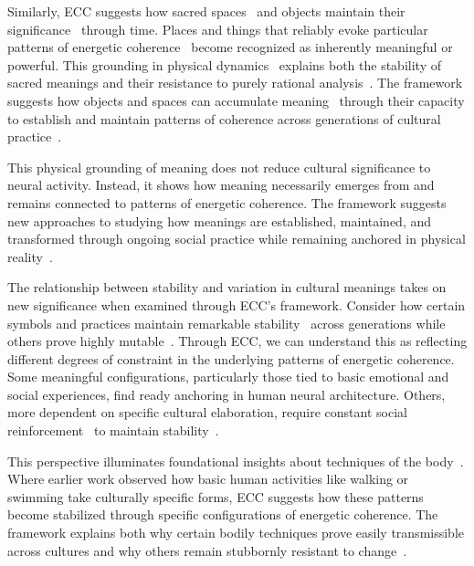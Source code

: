 Similarly, ECC suggests how sacred spaces~ and objects maintain their significance~ through time. Places and things that reliably evoke particular patterns of energetic coherence~ become recognized as inherently meaningful or powerful. This grounding in physical dynamics~ explains both the stability of sacred meanings and their resistance to purely rational analysis~\cite{eliade1959sacred}. The framework suggests how objects and spaces can accumulate meaning~ through their capacity to establish and maintain patterns of coherence across generations of cultural practice~\cite{keane2003semiotics,myers2015rendering}.

This physical grounding of meaning does not reduce cultural significance to neural activity. Instead, it shows how meaning necessarily emerges from and remains connected to patterns of energetic coherence. The framework suggests new approaches to studying how meanings are established, maintained, and transformed through ongoing social practice while remaining anchored in physical reality~\cite{csordas1990embodiment,ingold2011being}.

The relationship between stability and variation in cultural meanings takes on new significance when examined through ECC's framework. Consider how certain symbols and practices maintain remarkable stability~ across generations while others prove highly mutable~\cite{descola2005beyond}. Through ECC, we can understand this as reflecting different degrees of constraint in the underlying patterns of energetic coherence. Some meaningful configurations, particularly those tied to basic emotional and social experiences, find ready anchoring in human neural architecture. Others, more dependent on specific cultural elaboration, require constant social reinforcement~ to maintain stability~\cite{toren1999mind}.

This perspective illuminates foundational insights about techniques of the body~\cite{bourdieu1990logic}. Where earlier work observed how basic human activities like walking or swimming take culturally specific forms, ECC suggests how these patterns become stabilized through specific configurations of energetic coherence. The framework explains both why certain bodily techniques prove easily transmissible across cultures and why others remain stubbornly resistant to change~\cite{kohn2013how}.

